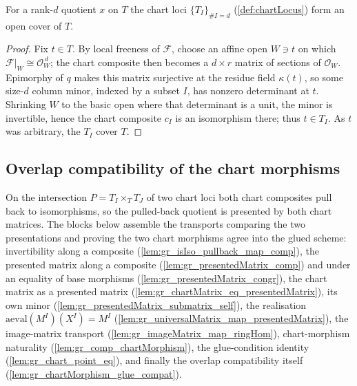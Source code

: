 \begin{lemma}\leanok
  \label{lem:chartLocus_isOpenCover}
  For a rank-\(d\) quotient \(x\) on \(T\) the chart loci \(\{T_I\}_{\#I = d}\)
  (\cref{def:chartLocus}) form an open cover of \(T\).
\end{lemma}
\begin{proof}
  Fix \(t \in T\). By local freeness of \(\mathcal{F}\), choose an affine open \(W \ni t\) on
  which \(\mathcal{F}|_W \cong \mathcal{O}_W^{\,d}\); the chart composite then becomes a
  \(d\times r\) matrix of sections of \(\mathcal{O}_W\). Epimorphy of \(q\) makes this matrix
  surjective at the residue field \(\kappa(t)\), so some size-\(d\) column minor, indexed by a
  subset \(I\), has nonzero determinant at \(t\). Shrinking \(W\) to the basic open where that
  determinant is a unit, the minor is invertible, hence the chart composite \(c_I\) is an
  isomorphism there; thus \(t \in T_I\). As \(t\) was arbitrary, the \(T_I\) cover \(T\).
\end{proof}


\subsection{Overlap compatibility of the chart morphisms}

On the intersection \(P = T_I \times_T T_J\) of two chart loci both chart composites pull
back to isomorphisms, so the pulled-back quotient is presented by both chart matrices. The
blocks below assemble the transports comparing the two presentations and proving the two
chart morphisms agree into the glued scheme: invertibility along a composite
(\cref{lem:gr_isIso_pullback_map_comp}), the presented matrix along a composite
(\cref{lem:gr_presentedMatrix_comp}) and under an equality of base morphisms
(\cref{lem:gr_presentedMatrix_congr}), the chart matrix as a presented matrix
(\cref{lem:gr_chartMatrix_eq_presentedMatrix}), its own minor
(\cref{lem:gr_presentedMatrix_submatrix_self}), the realisation
\(\mathrm{aeval}(M^I)(X^I) = M^I\) (\cref{lem:gr_universalMatrix_map_presentedMatrix}), the
image-matrix transport (\cref{lem:gr_imageMatrix_map_ringHom}), chart-morphism naturality
(\cref{lem:gr_comp_chartMorphism}), the glue-condition identity
(\cref{lem:gr_chart_point_eq}), and finally the overlap compatibility itself
(\cref{lem:gr_chartMorphism_glue_compat}).

